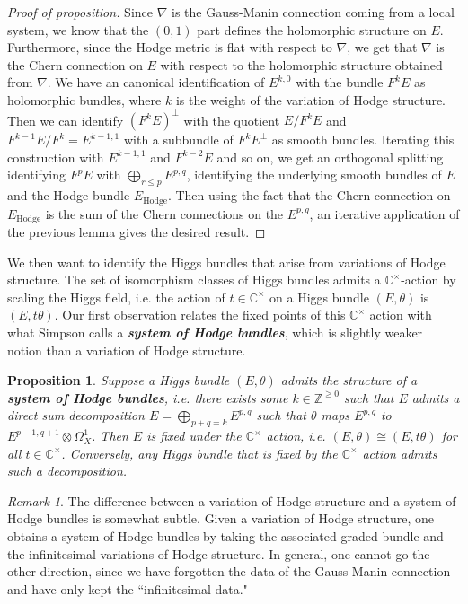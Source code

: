\documentclass[psamsfonts, 12pt]{amsart}
\newtheorem{prop}[thm]{Proposition}
\theoremstyle{definition}
\theoremstyle{remark}
\newtheorem*{rem*}{Remark}
\newcommand{\ib}[1]{\textbf{\textit{#1}}}
\newcommand{\Z}{\mathbb{Z}}
\newcommand{\C}{\mathbb{C}}
\begin{document}
%
\begin{proof}[Proof of proposition]
Since $\nabla$ is the Gauss-Manin connection coming from a local system,
we know that the $(0,1)$ part defines the holomorphic structure on $E$.
Furthermore, since the Hodge metric is flat with respect to $\nabla$,
we get that $\nabla$ is the Chern connection on $E$ with respect to the
holomorphic structure obtained from $\nabla$. We have an canonical identification
of $E^{k,0}$ with the bundle $F^kE$ as holomorphic bundles, where $k$ is the
weight of the variation of Hodge structure. Then we can identify
$(F^kE)^\perp$ with the quotient $E/F^kE$ and $F^{k-1}E/F^k = E^{k-1,1}$
with a subbundle of $F^kE^\perp$ as smooth bundles. Iterating this
construction with $E^{k-1,1}$ and $F^{k-2}E$ and so on, we get an
orthogonal splitting identifying $F^pE$ with $\bigoplus_{r\leq p}E^{p,q}$,
identifying the underlying smooth bundles of $E$ and the Hodge bundle
$E_{\mathrm{Hodge}}$. Then using the fact that the Chern connection on
$E_{\mathrm{Hodge}}$ is the sum of the Chern connections on the $E^{p,q}$,
an iterative application of the previous lemma gives the desired
result.
\end{proof}
%
We then want to identify the Higgs bundles that arise from variations
of Hodge structure. The set of isomorphism classes of Higgs bundles admits
a $\C^\times$-action by scaling the Higgs field, i.e. the action of
$t \in \C^\times$ on a Higgs bundle $(E,\theta)$ is $(E,t\theta)$. Our
first observation relates the fixed points of this $\C^\times$ action
with what Simpson calls a \ib{system of Hodge bundles}, which is
slightly weaker notion than a variation of Hodge structure.
%
\begin{prop}
Suppose a Higgs bundle $(E,\theta)$ admits the structure of a
\ib{system of Hodge bundles}, i.e. there exists some $k \in \Z^{\geq 0}$ such
that $E$ admits a direct sum decomposition $E = \bigoplus_{p+q=k}E^{p,q}$ such
that $\theta$ maps $E^{p,q}$ to $E^{p-1,q+1}\otimes\Omega^1_X$. Then $E$ is
fixed under the $\C^\times$ action, i.e. $(E,\theta) \cong (E,t\theta)$ for all
$t \in \C^\times$. Conversely, any Higgs bundle that is fixed by the $\C^\times$
action admits such a decomposition.
\end{prop}
%
\begin{rem*}
The difference between a variation of Hodge structure and a system of Hodge
bundles is somewhat subtle. Given a variation of Hodge structure, one
obtains a system of Hodge bundles by taking the associated graded
bundle and the infinitesimal variations of Hodge structure. In general,
one cannot go the other direction, since we have forgotten the data
of the Gauss-Manin connection and have only kept the ``infinitesimal data."
\end{rem*}
\end{document}
